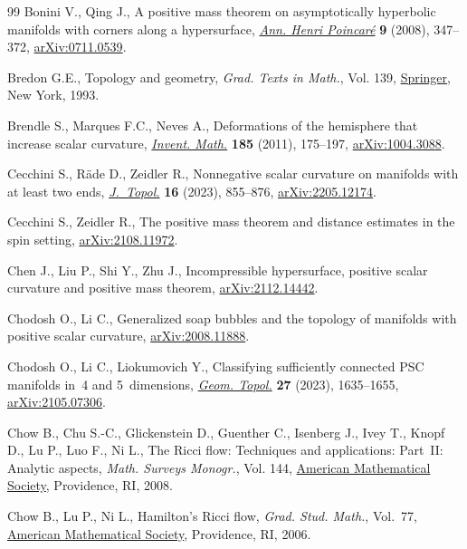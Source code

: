 \documentclass[10pt,a4paper]{amsart}
\numberwithin{equation}{section}
\begin{document}
\begin{thebibliography}{99}
Bonini V., Qing J., A positive mass theorem on asymptotically hyperbolic
  manifolds with corners along a hypersurface, \href{https://doi.org/10.1007/s00023-008-0358-8}{\textit{Ann. Henri Poincar\'e}}
  \textbf{9} (2008), 347--372, \href{https://arxiv.org/abs/0711.0539}{arXiv:0711.0539}.

Bredon G.E., Topology and geometry, \textit{Grad. Texts in Math.}, Vol. 139,
  \href{https://doi.org/10.1007/978-1-4757-6848-0}{Springer}, New York, 1993.

Brendle S., Marques F.C., Neves A., Deformations of the hemisphere that
  increase scalar curvature, \href{https://doi.org/10.1007/s00222-010-0305-4}{\textit{Invent. Math.}} \textbf{185} (2011),
  175--197, \href{https://arxiv.org/abs/1004.3088}{arXiv:1004.3088}.

Cecchini S., R\"ade D., Zeidler R., Nonnegative scalar curvature on manifolds
  with at least two ends, \href{https://doi.org/10.1112/topo.12303}{\textit{J.~Topol.}} \textbf{16} (2023), 855--876,
  \href{https://arxiv.org/abs/2205.12174}{arXiv:2205.12174}.

Cecchini S., Zeidler R., The positive mass theorem and distance estimates in
  the spin setting, \href{https://arxiv.org/abs/2108.11972}{arXiv:2108.11972}.

Chen J., Liu P., Shi Y., Zhu J., Incompressible hypersurface, positive scalar
  curvature and positive mass theorem, \href{https://arxiv.org/abs/2112.14442}{arXiv:2112.14442}.

Chodosh O., Li C., Generalized soap bubbles and the topology of manifolds with
  positive scalar curvature, \href{https://arxiv.org/abs/2008.11888}{arXiv:2008.11888}.

Chodosh O., Li C., Liokumovich Y., Classifying sufficiently connected {PSC}
  manifolds in~4 and 5~dimensions, \href{https://doi.org/10.2140/gt.2023.27.1635}{\textit{Geom. Topol.}} \textbf{27} (2023),
  1635--1655, \href{https://arxiv.org/abs/2105.07306}{arXiv:2105.07306}.

Chow B., Chu S.-C., Glickenstein D., Guenther C., Isenberg J., Ivey T., Knopf
  D., Lu P., Luo F., Ni L., The {R}icci flow: {T}echniques and applications:
  {P}art~{II}: {A}nalytic aspects, \textit{Math. Surveys Monogr.}, Vol. 144,
  \href{https://doi.org/10.1090/surv/144}{American Mathematical Society}, Providence, RI, 2008.

Chow B., Lu P., Ni L., Hamilton's {R}icci flow, \textit{Grad. Stud. Math.},
  Vol.~77, \href{https://doi.org/10.1090/gsm/077}{American Mathematical Society}, Providence, RI, 2006.


\end{thebibliography}
\end{document}
